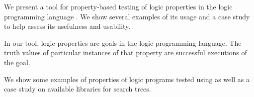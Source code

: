 We present a tool for property-based testing of logic properties
in the logic programming language \Prolog{}.
%
We show several examples of its usage and a case study to help assess
its usefulness and usability.


In our tool, logic properties are goals in the logic programming language.
%
The truth values of particular instances of that property are successful
executions of the goal.


We show some examples of properties of logic programs tested
using \plqc{} as well as a case study on available libraries for search
trees.

